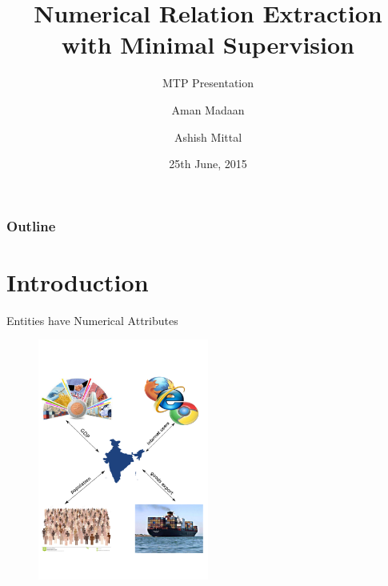 \documentclass{beamer}
\title[Numerical Relation Extraction with Minimal Supervision]{Numerical Relation Extraction with Minimal Supervision} %
\subtitle{MTP Presentation}
\author[]{Aman Madaan \and Ashish Mittal}
\institute[]{
  Indian Institute of Technology Bombay, Mumbai
}
\date{25th June, 2015}
\begin{document}
\begin{frame}
\titlepage %
\end{frame}

\begin{frame}
\frametitle{Outline} %
\tableofcontents %
\end{frame}


\section{Introduction} %
\begin{frame}{Entities have Numerical Attributes}

    \begin{figure}
    \centering
    \includegraphics[width = 0.5\textwidth]{images/motivation}
  \end{figure}
 
\end{frame}
\end{document}
